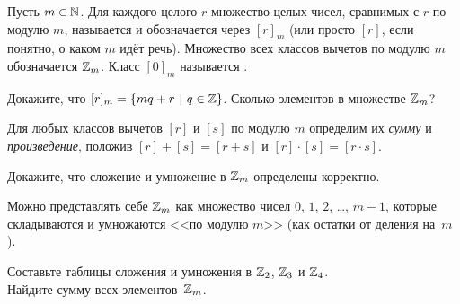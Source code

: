 \documentclass[a4paper, 12pt]{article}
\begin{document}


 Пусть $m\in\mathbb{N}$.
Для  каждого целого $r$ множество целых чисел, сравнимых
с $r$ по модулю $m$, называется 
и обозначается через $[r]_m$ (или просто $[r]$, если понятно, о каком $m$ идёт
речь). Множество всех классов вычетов по  модулю $m$ обозначается $\mathbb{Z}_m$. Класс $[0]_m$
называется . 

  Докажите, что $[r]_m = \{mq + r\ |\ q\in\Z\}$.  Сколько
элементов в множестве $\mathbb{Z}_m$? 

Для любых классов вычетов $[r]$ и $[s]$ по модулю $m$ определим
их {\it сумму}  и {\it произведение}, положив $[r] + [s] = [r + s]$ и
$[r]\cdot[s] = [r\cdot s]$.

Докажите, что сложение и умножение в $\mathbb{Z}_m$ определены
корректно. 

{\small
{} Можно представлять себе $\mathbb{Z}_m$ как множество
чисел $0$, $1$, $2$, \ldots, $m - 1$, которые складываются и
умножаются <<по модулю $m$>> (как остатки от деления на~$m$).
}








Составьте таблицы сложения и умножения в $\mathbb{Z}_2$, $\mathbb{Z}_3$ и $\mathbb{Z}_4$.\\
Найдите сумму всех элементов~$\mathbb{Z}_m$.
\end{document}
